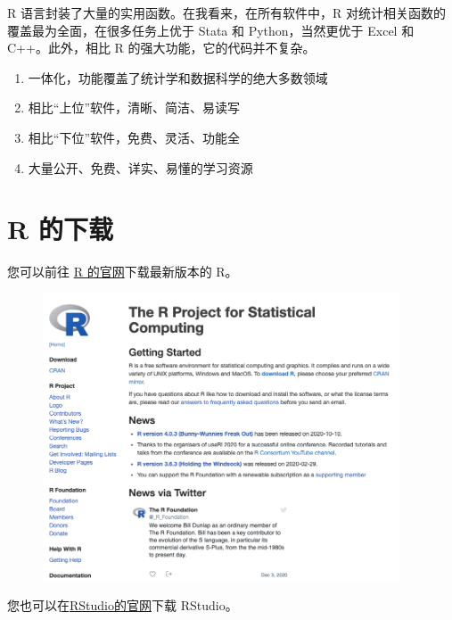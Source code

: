 \documentclass[
  letterpaper,
]{ctexbook}
\providecommand{\tightlist}{%
  \setlength{\itemsep}{0pt}\setlength{\parskip}{0pt}}\usepackage{longtable,booktabs,array}
\begin{document}
R 语言封装了大量的实用函数。在我看来，在所有软件中，R
对统计相关函数的覆盖最为全面，在很多任务上优于 Stata 和
Python，当然更优于 Excel 和 C++。此外，相比 R
的强大功能，它的代码并不复杂。

\begin{enumerate}
\def\labelenumi{\arabic{enumi}.}
\tightlist
\item
  一体化，功能覆盖了统计学和数据科学的绝大多数领域
\item
  相比``上位''软件，清晰、简洁、易读写
\item
  相比``下位''软件，免费、灵活、功能全
\item
  大量公开、免费、详实、易懂的学习资源
\end{enumerate}

\hypertarget{r-ux7684ux4e0bux8f7d}{%
\section{R 的下载}\label{r-ux7684ux4e0bux8f7d}}

您可以前往 \href{https://www.r-project.org/}{R 的官网}下载最新版本的 R。

\begin{figure}

{\centering \includegraphics[width=4.16667in,height=\textheight]{fig/rweb.png}

}

\end{figure}

您也可以在\href{https://rstudio.com/}{RStudio的官网}下载 RStudio。
\end{document}
